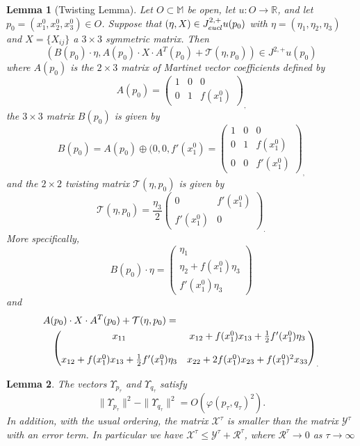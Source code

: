 \documentclass[10pt,a4paper]{amsart}
\newtheorem{lemma}{Lemma}
\begin{document}
\begin{lemma}[Twisting Lemma]\label{twlemma}
Let $O\subset \mathbb{M}$ be open, let $u: O\to\mathbb{R}$, and let $p_0=(x_1^0,x_2^0,x_3^0) \in O$. Suppose that $(\eta, X)\in J^{2,+}_{\textmd{eucl}} u(p_0)$ with $\eta=(\eta_1,\eta_2,\eta_3)$ and $X=\{X_{ij}\}$ a $3\times 3$ symmetric matrix. Then 
\begin{equation}\label{twisty}
(B(p_0)\cdot \eta, A(p_0)\cdot X\cdot A^T(p_0)+\mathcal{T}(\eta,p_0))\in J^{2,+} u(p_0)
\end{equation}
where $A(p_0)$ is the $2\times3$ matrix of Martinet vector coefficients defined by
\[A(p_0)=\begin{pmatrix}1&0&0\\0&1&f(x_1^0)\end{pmatrix}_,\]
the $3\times 3$ matrix $B(p_0)$ is given by 
\[B(p_0)=A(p_0)\oplus(0,0,f'(x_1^0)=\begin{pmatrix}1&0&0\\0&1&f(x_1^0)\\0&0&f'(x_1^0) \end{pmatrix}_,\]
and the $2\times2$ twisting matrix $\mathcal{T}(\eta,p_0)$ is given by
\[\mathcal{T}(\eta,p_0)=\frac{\eta_3}{2}\begin{pmatrix}0&f'(x_1^0)\\
f'(x_1^0)&0\end{pmatrix}_.\]
More specifically,
\[B(p_0)\cdot\eta=\begin{pmatrix}
\eta_1\\
\eta_2+f(x_1^0)\eta_3\\
f'(x_1^0)\eta_3
\end{pmatrix}\]
and 
\begin{eqnarray*}
\lefteqn{A(p_0)\cdot X\cdot A^T(p_0)+\mathcal{T}(\eta,p_0)=} & & \\
& & \begin{pmatrix}x_{11}&x_{12}+f(x_1^0)x_{13}+\frac{1}{2}f'(x_1^0)\eta_3\\
\mbox{} & \mbox{} \\
x_{12}+f(x_1^0)x_{13}+\frac{1}{2}f'(x_1^0)\eta_3&x_{22}+2f(x_1^0)x_{23}+f(x_1^0)^2x_{33}\end{pmatrix}_.
\end{eqnarray*}
\end{lemma}

\begin{lemma}\label{5.2}
The vectors $\Upsilon_{p_\tau}$ and $\Upsilon_{q_\tau}$ satisfy
\begin{equation}\|\Upsilon_{p_\tau}\|^2-\|\Upsilon_{q_\tau}\|^2=O(\varphi(p_\tau,q_\tau)^2).\end{equation}
In addition, with the usual ordering, the matrix $\mathcal{X}^\tau$ is smaller than the matrix $\mathcal{Y}^\tau$ with an error term. In particular we have $\mathcal{X}^\tau\leq\mathcal{Y}^\tau+\mathcal{R}^\tau$, where $\mathcal{R}^\tau\rightarrow0$ as $\tau\rightarrow\infty$
\end{lemma}
\end{document}
